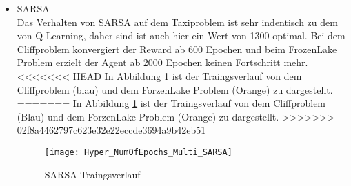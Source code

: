\begin{itemize}
    \item SARSA\\
    Das Verhalten von SARSA auf dem Taxiproblem ist sehr indentisch zu dem von Q-Learning, daher sind ist auch hier ein Wert von 1300 optimal.
    Bei dem Cliffproblem konvergiert der Reward ab 600 Epochen und beim FrozenLake Problem erzielt der Agent ab 2000 Epochen keinen Fortschritt mehr.
<<<<<<< HEAD
    In Abbildung \ref{fig:SARSA_NumOfEpisods} ist der Traingsverlauf von dem Cliffproblem (blau) und dem ForzenLake Problem (Orange) zu dargestellt.
=======
    In Abbildung \ref{fig:SARSA_NumOfEpisods} ist der Traingsverlauf von dem Cliffproblem (Blau) und dem ForzenLake Problem (Orange) zu dargestellt.
>>>>>>> 02f8a4462797c623e32e22eccde3694a9b42eb51
    \begin{figure}[H]
      \centering
      \texttt{[image: Hyper\_NumOfEpochs\_Multi\_SARSA]}
      \caption{SARSA Traingsverlauf}
      \label{fig:SARSA_NumOfEpisods}
  \end{figure}
\end{itemize}

